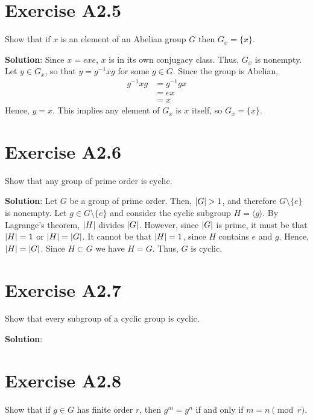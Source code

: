\documentclass{book}
\begin{document}
\section*{Exercise A2.5}
    Show that if $x$ is an element of an Abelian group $G$ then $G_x = \{x\}$.
    
    \textbf{Solution}: Since $x = exe$, $x$ is in its own conjugacy class. Thus, $G_x$ is nonempty. Let $y \in G_x$, so that $y = g^{-1}x g$ for some $g\in G$. Since the group is Abelian,
    \begin{align}
        g^{-1}xg &= g^{-1}g x \\
        &= ex \\
        &= x
    \end{align}
    Hence, $y=x$. This implies any element of $G_x$ is $x$ itself, so $G_x = \{x\}$.
    
\section*{Exercise A2.6}
    Show that any group of prime order is cyclic.
    
    \textbf{Solution}: Let $G$ be a group of prime order. Then, $\abs{G}>1$, and therefore $G\setminus\{e\}$ is nonempty. Let $g \in G\setminus\{e\}$ and consider the cyclic subgroup $H = \langle g \rangle$. By Lagrange's theorem, $\abs{H}$ divides $\abs{G}$. However, since $\abs{G}$ is prime, it must be that $\abs{H} = 1$ or $\abs{H} = \abs{G}$. It cannot be that $\abs{H} =1$, since $H$ contains $e$ and $g$. Hence, $\abs{H} = \abs{G}$. Since $H\subset G$ we have $H = G$. Thus, $G$ is cyclic.

\section*{Exercise A2.7}
    Show that every subgroup of a cyclic group is cyclic.
    
    \textbf{Solution}:

\section*{Exercise A2.8}
    Show that if $g\in G$ has finite order $r$, then $g^m = g^n$ if and only if $m=n\pmod{r}$.
    
\end{document}
